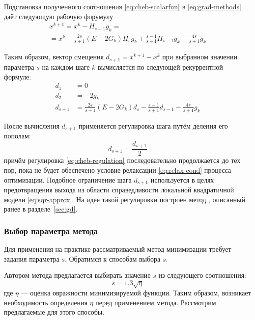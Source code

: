 Подстановка полученного соотношения \eqref{eq:cheb-scalarfun}
в \eqref{eq:grad-methods} даёт следующую рабочую форумулу
\begin{multline}
  x^{k+1} = x^k - H_{s+1}g_k =\\=
  x^k-\frac{2s}{s+1}(E-2G_k)H_sg_k+\frac{s-1}{s+1}H_{s-1}g_k-\frac{4s}{s+1}g_k
\end{multline}

Таким образом, вектор смещения $d_{s+1} = x^{k+1} - x^k$ при выбранном
значении параметра $s$ на каждом шаге $k$ вычисляется по следующей
рекуррентной формуле:
\begin{equation}
  \label{eq:cheb-workhorse}
  \begin{aligned}
    d_1 &= 0\\
    d_2 &= -2g_k \\
    d_{s+1} &=
    \frac{2s}{s+1}(E-2G_k)d_{s}-\frac{s-1}{s+1}d_{s-1}-\frac{4s}{s+1}g_k
  \end{aligned}
\end{equation}

После вычисления $d_{s+1}$ применяется регулировка шага путём деления
его пополам:
\begin{equation}
  \label{eq:cheb-regulation}
  d_{s+1} = \frac{d_{s+1}}{2}
\end{equation}
причём регулировка \eqref{eq:cheb-regulation} последовательно
продолжается до тех пор, пока не будет обеспечено условие релаксации
\eqref{eq:relax-cond} процесса оптимизации. Подобное ограничение шага
$d_{s+1}$ используется в целях предотвращения выхода из области
справедливости локальной квадратичной модели \eqref{eq:sqr-approx}. На
идее такой регулировки построен метод \rgd{}, описанный ранее в
разделе \ref{sec:gd}.

\subsubsection{Выбор параметра метода}
\label{sec:cheb-param}

Для применения на практике рассматриваемый метод минимизации требует
задания параметра $s$. Обратимся к способам выбора $s$.

Автором метода предлагается выбирать значение $s$ из следующего
соотношения:
\begin{equation}
  \label{eq:cheb-param}
  s = 1.3 \sqrt{\eta}
\end{equation}
где $\eta$ — оценка овражности минимизируемой функции. Таким образом,
возникает необходимость определения $\eta$ перед применением метода.
Рассмотрим предлагаемые для этого способы.

